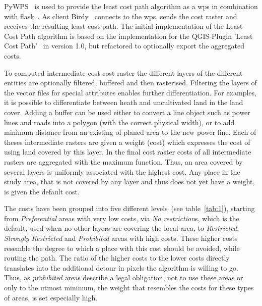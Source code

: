 PyWPS~\cite{noauthor_welcome_2016} is used to provide the least cost path algorithm as a \acrfull{wps} in combination with flask~\cite{noauthor_flask_nodate}.
As client Birdy~\cite{noauthor_birdy_nodate} connects to the \acrshort{wps}, sends the cost raster and receives the resulting least cost path.
The initial implementation of the Least Cost Path algorithm is based on the implementation for the QGIS-Plugin
'Least Cost Path'~\cite{noauthor_leastcostpathdijkstra_algorithmpy_2022} in version 1.0, but refactored to optionally export the aggregated costs.

To computed intermediate cost cost raster the different layers of the different entities are optionally filtered, buffered and then rasterised.
Filtering the layers of the vector files for special attributes enables further differentiation.
For examples, it is possible to differentiate between heath and uncultivated land in the land cover.
Adding a buffer can be used either to convert a line object such as power lines and roads into a polygon (with the
correct physical width), or to add minimum distance from an existing of planed area to the new power line.
Each of theses intermediate rasters are given a weight (cost) which expresses the cost of using land covered by this layer.
In the final cost raster costs of all intermediate rasters are aggregated with the maximum function.
Thus, an area covered by several layers is uniformly associated with the highest cost.
Any place in the study area, that is not covered by any layer and thus does not yet have a weight, is given the default cost.

The costs have been grouped into five different levels~(see table~\ref{tab:1}), starting from \textit{Preferential} areas with
very low costs, via \textit{No restriction}s, which is the default, used when no other layers are covering the local area,
to \textit{Restricted}, \textit{Strongly Restricted} and \textit{Prohibited} areas with high costs.
These higher costs resemble the degree to which a place with this cost should be avoided, while routing the path.
The ratio of the higher costs to the lower costs directly translates into the additional detour in pixels
the algorithm is willing to go.
Thus, as \textit{prohibited} areas describe a legal obligation, not to use these areas or only to the utmost minimum,
the weight that resembles the costs for these types of areas, is set especially high.\\

